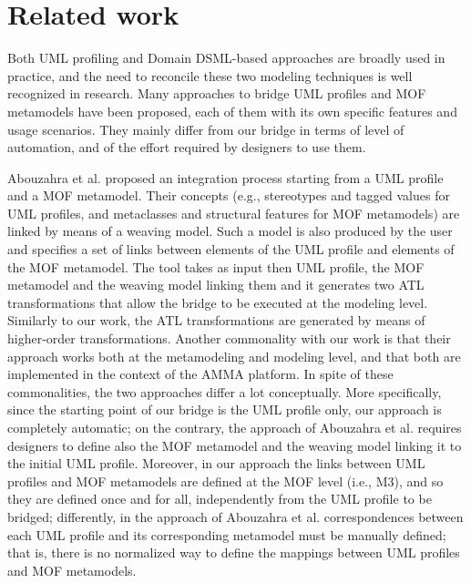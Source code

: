 \section{Related work}\label{sec:related}

Both UML profiling and Domain DSML-based approaches are broadly used in practice, and the need to reconcile these two
modeling techniques is well recognized in research. 
Many approaches to bridge UML profiles and MOF metamodels have been proposed, each of them with its own specific features and 
usage scenarios. 
They mainly differ from our bridge in terms of level of automation, and of the effort required by designers to use them.

Abouzahra et al. \cite{Abouzahra} proposed an integration process starting from a UML profile and a MOF metamodel.
Their concepts (e.g., stereotypes and tagged values for UML profiles, and metaclasses and structural features for MOF metamodels) 
are linked by means of a weaving model. Such a model is also produced by the user and specifies a set of links between elements
of the UML profile and elements of the MOF metamodel.
The tool takes as input then UML profile, the MOF metamodel and the weaving model linking them and it generates two ATL transformations that allow
the bridge to be executed at the modeling level. Similarly to our work, the ATL transformations are generated by means of 
higher-order transformations. Another commonality with our work is that their approach works both at the metamodeling and modeling level,
and that both are implemented in the context of the AMMA platform.
In spite of these commonalities, the two approaches differ a lot conceptually. More specifically,
since the starting point of our bridge is the UML profile only, our approach is completely automatic;
on the contrary,  the approach of Abouzahra et al. requires designers to define
also the MOF metamodel and the weaving model linking it to the initial UML profile.
Moreover, in our approach the links between UML profiles and MOF metamodels are defined at the MOF level (i.e., M3), and so
they are defined once and for all, independently from the UML profile to be bridged; differently, 
in the approach of Abouzahra et al. correspondences between each UML profile and its corresponding metamodel must be manually defined; 
that is, there is no normalized way to define the mappings between UML profiles and MOF metamodels.


